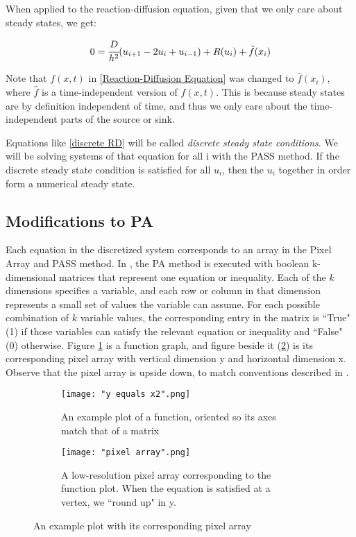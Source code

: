 \documentclass[11pt]{article}
\begin{document}
When applied to the reaction-diffusion equation, given that we only care about steady states, we get:

\begin{equation}
    \label{discrete RD}
    0 = \cfrac{D}{h^2} (u_{i+1} - 2u_i + u_{i-1}) + R(u_i) + \hat{f}(x_i)
\end{equation}

\noindent Note that $f(x,t)$ in \cref{Reaction-Diffusion Equation} was changed to $\hat{f}(x_i)$, where $\hat{f}$ is a time-independent version of $f(x,t)$. This is because steady states are by definition independent of time, and thus we only care about the time-independent parts of the source or sink. 

Equations like \cref{discrete RD} will be called \textit{discrete steady state conditions}. We will be solving systems of that equation for all i with the PASS method. If the discrete steady state condition is satisfied for all $u_i$, then the $u_i$ together in order form a numerical steady state.

\subsection{Modifications to PA}

Each equation in the discretized system corresponds to an array in the Pixel Array and PASS method. In \citep{Introduction_to_PA}, the PA method is executed with boolean k-dimensional matrices that represent one equation or inequality. Each of the $k$ dimensions specifies a variable, and each row or column in that dimension represents a small set of values the variable can assume. For each possible combination of $k$ variable values, the corresponding entry in the matrix is ``True" (1) if those variables can satisfy the relevant equation or inequality and ``False" (0) otherwise. Figure \cref{sample_function} is a function graph, and figure beside it (\cref{sample_pixel_array}) is its corresponding pixel array with vertical dimension y and horizontal dimension x. Observe that the pixel array is upside down, to match conventions described in \citep{Introduction_to_PA}.

\begin{figure}[h]
\begin{subfigure}{.4\textwidth}
  \centering
  \captionsetup{width=0.8\textwidth}
  \texttt{[image: "y equals x2".png]}
  \caption{An example plot of a function, oriented so its axes match that of a matrix}
  \label{sample_function}
\end{subfigure}%
\begin{subfigure}{.4\textwidth}
  \centering
  \captionsetup{width=0.8\textwidth}
  \texttt{[image: "pixel array".png]}
  \caption{A low-resolution pixel array corresponding to the function plot. When the equation is satisfied at a vertex, we ``round up" in y.}
  \label{sample_pixel_array}
\end{subfigure}%
\caption{An example plot with its corresponding pixel array}
\label{plot_and_pa}
\end{figure}
\end{document}
